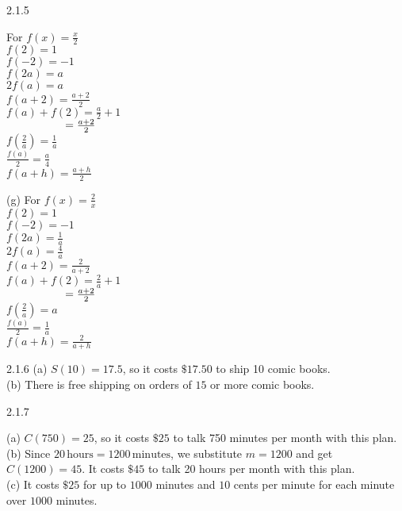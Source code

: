 \begin{Answer}{2.1.5}
\vspace{3mm}

For $f(x) = \frac{x}{2}$\\
$f(2) = 1$\\
$f(-2) = -1$\\
$f(2a) = a$\\
$2 f(a) = a$\\
$f(a+2) = \frac{a+2}{2}$\\
$f(a) + f(2) = \frac{a}{2}+ 1$ \\
$\hphantom{f(a) + f(2)} = \frac{a+2}{2}$\\
$f \left( \frac{2}{a} \right) = \frac{1}{a}$\\
$\frac{f(a)}{2} =  \frac{a}{4}$\\
$f(a + h) = \frac{a+h}{2}$\\

\vspace{3mm}

(g) For $f(x) = \frac{2}{x}$\\
$f(2) = 1$\\
$f(-2) = -1$\\
$f(2a) = \frac{1}{a}$\\
$2 f(a) = \frac{4}{a}$\\
$f(a+2) = \frac{2}{a+2}$\\
$f(a) + f(2) = \frac{2}{a}+1$ \\
$\hphantom{f(a)+f(2)}=\frac{a+2}{2}$\\
$f \left( \frac{2}{a} \right) = a$\\
$\frac{f(a)}{2} =  \frac{1}{a}$\\
$f(a + h) = \frac{2}{a+h}$\\

\end{Answer}
\begin{Answer}{2.1.6}
(a) \hspace{2mm} $S(10) = 17.5$, so it costs $\$ 17.50$ to ship 10 comic books. \\
(b) \hspace{2mm} There is free shipping on orders of $15$ or more comic books. \\

\end{Answer}
\begin{Answer}{2.1.7}

(a) \hspace{2mm} $C(750) = 25$, so it costs $\$ 25$ to talk 750 minutes per month with this plan. \\

(b) \hspace{2mm} Since $20 \, \text{hours} = 1200 \, \text{minutes}$, we substitute $m = 1200$ and get  $C(1200) = 45$.  It costs $\$ 45$ to talk 20 hours per month with this plan. \\

(c) \hspace{2mm}  It costs $\$25$ for up to $1000$ minutes and $10$ cents per minute for each minute over $1000$ minutes.


\end{Answer}
